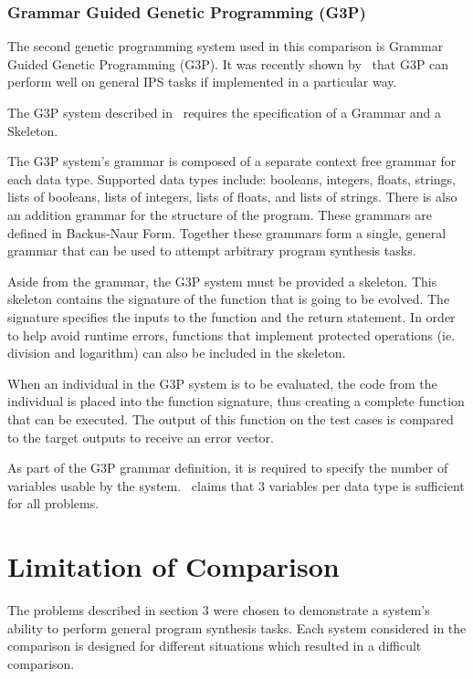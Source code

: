 \subsubsection{Grammar Guided Genetic Programming (G3P)}

The second genetic programming system used in this comparison is Grammar Guided Genetic Programming (G3P). It was recently shown by~\cite{Forstenlechner:2017:eurogp} that G3P can perform well on general IPS tasks if implemented in a particular way.

The G3P system described in~\cite{Forstenlechner:2017:eurogp} requires the specification of a Grammar and a Skeleton. 

The G3P system's grammar is composed of a separate context free grammar for each data type. Supported data types include: booleans, integers, floats, strings, lists of booleans, lists of integers, lists of floats, and lists of strings. There is also an addition grammar for the structure of the program.  These grammars are defined in Backus-Naur Form. Together these grammars form a single, general grammar that can be used to attempt arbitrary program synthesis tasks.

Aside from the grammar, the G3P system must be provided a skeleton. This skeleton contains the signature of the function that is going to be evolved. The signature specifies the inputs to the function and the return statement. In order to help avoid runtime errors, functions that implement protected operations (ie. division and logarithm) can also be included in the skeleton.

When an individual in the G3P system is to be evaluated, the code from the individual is placed into the function signature, thus creating a complete function that can be executed. The output of this function on the test cases is compared to the target outputs to receive an error vector.

As part of the G3P grammar definition, it is required to specify the number of variables usable by the system.~\cite{Forstenlechner:2017:eurogp} claims that 3 variables per data type is sufficient for all problems.

\section{Limitation of Comparison}

The problems described in section 3 were chosen to demonstrate a system's ability to perform general program synthesis tasks. Each system considered in the comparison is designed for different situations which resulted in a difficult comparison.

